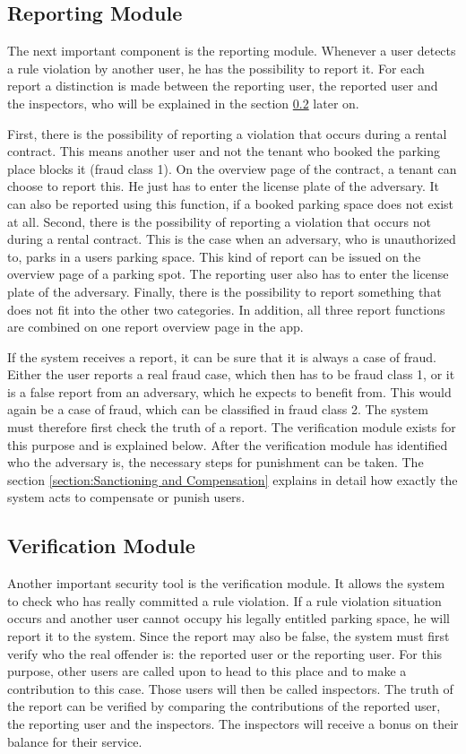 \subsection{Reporting Module} The next important component is the reporting module. Whenever a user detects a rule violation by another user, he has the possibility to report it. For each report a distinction is made between the reporting user, the reported user and the inspectors, who will be explained in the section \ref{sec:Verification Module} later on.

First, there is the possibility of reporting a violation that occurs during a rental contract. This means another user and not the tenant who booked the parking place blocks it (fraud class 1). On the overview page of the contract, a tenant can choose to report this. He just has to enter the license plate of the adversary. It can also be reported using this function, if a booked parking space does not exist at all. Second, there is the possibility of reporting a violation that occurs not during a rental contract. This is the case when an adversary, who is unauthorized to, parks in a users parking space. This kind of report can be issued on the overview page of a parking spot. The reporting user also has to enter the license plate of the adversary. Finally, there is the possibility to report something that does not fit into the other two categories. In addition, all three report functions are combined on one report overview page in the app.

If the system receives a report, it can be sure that it is always a case of fraud. Either the user reports a real fraud case, which then has to be fraud class 1, or it is a false report from an adversary, which he expects to benefit from. This would again be a case of fraud, which can be classified in fraud class 2. The system must therefore first check the truth of a report. The verification module exists for this purpose and is explained below. After the verification module has identified who the adversary is, the necessary steps for punishment can be taken. The section \ref{section:Sanctioning and Compensation}  explains in detail how exactly the system acts to compensate or punish users.

\subsection{Verification Module}\label{sec:Verification Module} Another important security tool is the verification module. It allows the system to check who has really committed a rule violation. If a rule violation situation occurs and another user cannot occupy his legally entitled parking space, he will report it to the system. Since the report may also be false, the system must first verify who the real offender is: the reported user or the reporting user. For this purpose, other users are called upon to head to this place and to make a contribution to this case. Those users will then be called inspectors. The truth of the report can be verified by comparing the contributions of the reported user, the reporting user and the inspectors. The inspectors will receive a bonus on their balance for their service.


